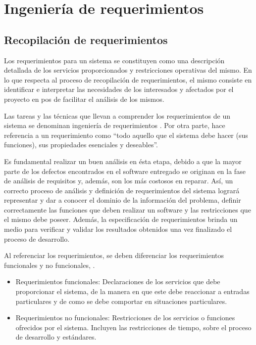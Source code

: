 \chapter{Ingeniería de requerimientos}
\section{Recopilación de requerimientos}
    \par
    Los requerimientos para un sistema se constituyen como una descripción detallada de los servicios proporcionados y restricciones operativas del mismo. En lo que respecta al proceso de recopilación de requerimientos, el mismo consiste en identificar e interpretar las necesidades de los interesados y afectados por el proyecto en pos de facilitar el análisis de los mismos.
    
    \par
    Las tareas y las técnicas que llevan a comprender los requerimientos de un sistema se denominan ingeniería de requerimientos \cite{Press10}. Por otra parte, \cite{Som05} hace referencia a un requerimiento como ``todo aquello que el sistema debe hacer (sus funciones), sus propiedades esenciales y deseables''.
    
    \par
    Es fundamental realizar un buen análisis en ésta etapa, debido a que la mayor parte de los defectos encontrados en el software entregado se originan en la fase de análisis de requisitos y, además, son los más costosos en reparar. Así, un correcto proceso de análisis y definición de requerimientos del sistema logrará representar y dar a conocer el dominio de la información del problema, definir correctamente las funciones que deben realizar un software y las restricciones que el mismo debe poseer. Además, la especificación de requerimientos brinda un medio para verificar y validar los resultados obtenidos una vez finalizado el proceso de desarrollo.
    
    \par
    Al referenciar los requerimientos, se deben diferenciar los requerimientos funcionales y no funcionales, \cite{Som05}.\\
    \begin{itemize}
        \item Requerimientos funcionales: Declaraciones de los servicios que debe proporcionar el sistema, de la manera en que este debe reaccionar a entradas particulares y de como se debe comportar en situaciones particulares.
        
        \item Requerimientos no funcionales: Restricciones de los servicios o funciones ofrecidos por el sistema. Incluyen las restricciones de tiempo, sobre el proceso de desarrollo y estándares.
    \end{itemize}
